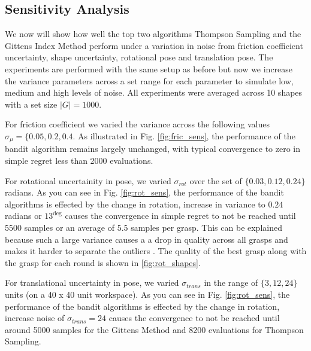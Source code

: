 \documentclass[journal,transmag]{IEEEtran}%
\begin{document}
\subsection{Sensitivity Analysis }
We now will show how well the top two algorithms Thompson Sampling and the Gittens Index Method perform under a variation in noise from friction coefficient uncertainty, shape uncertainty, rotational pose and translation pose. The experiments are performed with the same setup as before but now we increase the variance parameters across a set range for each parameter to simulate low, medium and high levels of noise. All experiments were averaged across 10 shapes with a set size $|G| = 1000$. 

For friction coefficient we varied the variance across the following values $\sigma_{\mu} = \lbrace 0.05, 0.2, 0.4$. As illustrated in Fig. \ref{fig:fric_sens}, the performance of the bandit algorithm remains largely unchanged, with typical convergence to zero in simple regret less than 2000 evaluations.

For rotational uncertainity in pose, we varied $\sigma_{rot}$ over the set of $\lbrace 0.03, 0.12,0.24\rbrace$ radians. As you can see in Fig. \ref{fig:rot_sens}, the performance of the bandit algorithms is effected by the change in rotation, increase in variance to $0.24$ radians or $13^{\deg}$  causes the convergence in simple regret to not be reached until 5500 samples or an average of 5.5 samples per grasp. This can be explained because such a large variance causes a a drop in quality across all grasps and makes it harder to separate the outliers \cite{gabillon2012bes}. The quality of the best grasp along with the grasp for each round is shown in \ref{fig:rot_shapes}. 


For translational uncertainty in pose, we varied $\sigma_{trans}$ in the range of $\lbrace 3,12, 24 \rbrace$ units (on a 40 x 40 unit workspace). As you can see in Fig. \ref{fig:rot_sens}, the performance of the bandit algorithms is effected by the change in rotation, increase noise of $\sigma_{trans} = 24$ causes the convergence to not be reached until around 5000 samples for the Gittens Method and  8200 evaluations for Thompson Sampling.
\end{document}
